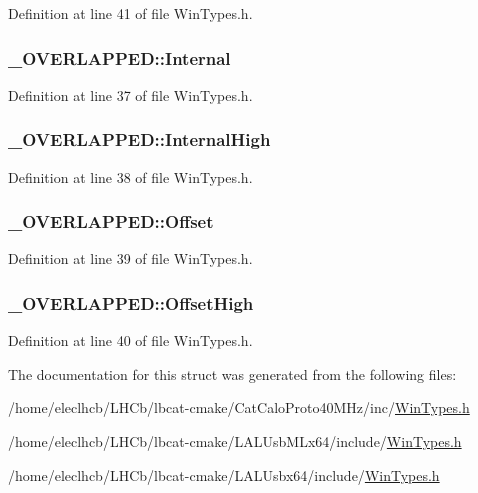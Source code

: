 Definition at line 41 of file WinTypes.h.\hypertarget{struct__OVERLAPPED_a2253d58d3120adff7f6d0242400bc7b4}{
\subsubsection[{Internal}]{ {\bf \_\-OVERLAPPED::Internal}}}
\label{struct__OVERLAPPED_a2253d58d3120adff7f6d0242400bc7b4}


Definition at line 37 of file WinTypes.h.\hypertarget{struct__OVERLAPPED_a577d8d492b8872fb1840947e2d2b06a7}{
\subsubsection[{InternalHigh}]{ {\bf \_\-OVERLAPPED::InternalHigh}}}
\label{struct__OVERLAPPED_a577d8d492b8872fb1840947e2d2b06a7}


Definition at line 38 of file WinTypes.h.\hypertarget{struct__OVERLAPPED_a60b84fb65a45c8383a5274b38a3f4896}{
\subsubsection[{Offset}]{ {\bf \_\-OVERLAPPED::Offset}}}
\label{struct__OVERLAPPED_a60b84fb65a45c8383a5274b38a3f4896}


Definition at line 39 of file WinTypes.h.\hypertarget{struct__OVERLAPPED_a07370c1d35023959e51450a8e91c5a32}{
\subsubsection[{OffsetHigh}]{ {\bf \_\-OVERLAPPED::OffsetHigh}}}
\label{struct__OVERLAPPED_a07370c1d35023959e51450a8e91c5a32}


Definition at line 40 of file WinTypes.h.

The documentation for this struct was generated from the following files:\begin{DoxyCompactItemize}
\item 
/home/eleclhcb/LHCb/lbcat-\/cmake/CatCaloProto40MHz/inc/\hyperlink{CatCaloProto40MHz_2inc_2WinTypes_8h}{WinTypes.h}\item 
/home/eleclhcb/LHCb/lbcat-\/cmake/LALUsbMLx64/include/\hyperlink{LALUsbMLx64_2include_2WinTypes_8h}{WinTypes.h}\item 
/home/eleclhcb/LHCb/lbcat-\/cmake/LALUsbx64/include/\hyperlink{LALUsbx64_2include_2WinTypes_8h}{WinTypes.h}\end{DoxyCompactItemize}
